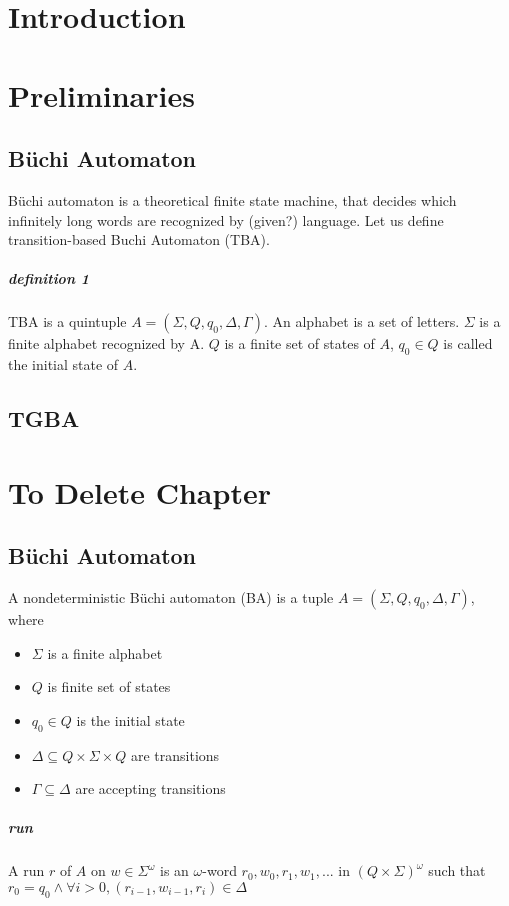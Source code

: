 \documentclass{fithesis3}
\begin{document}
	\chapter{Introduction}
	\chapter{Preliminaries}
		\section{Büchi Automaton}
			Büchi automaton is a theoretical finite state machine, that decides which infinitely long words are recognized by (given?) language. Let us define transition-based Buchi Automaton (TBA).
			\paragraph{definition 1}
			TBA is a quintuple $A=(\Sigma, Q, q_0, \Delta, \Gamma)$. An alphabet is a set of letters. $\Sigma$ is a finite alphabet recognized by A. $Q$ is a finite set of states of $A$, $q_0 \in Q$ is called the initial state of $A$.
		\section{TGBA}
	\chapter{To Delete Chapter}
		\section{Büchi Automaton}
		A nondeterministic Büchi automaton (BA) is a tuple 
		$A=(\Sigma, Q, q_0, \Delta, \Gamma)$,
		where
		\begin{itemize}
			\item $\Sigma$ is a finite alphabet
			\item $Q$ is finite set of states
			\item $q_0 \in Q$ is the initial state
			\item $\Delta \subseteq Q \times \Sigma \times Q$
			are transitions
			\item $\Gamma \subseteq \Delta$
			are accepting transitions
		\end{itemize} 
		\paragraph{run}
		A run $r$ of $A$ on $w \in \Sigma^\omega$
		is an $\omega$-word $r_0, w_0, r_1, w_1,...$ in $(Q\times\Sigma)^\omega$
		such that $r_0 = q_0 \land\forall i>0, (r_{i-1}, w_{i-1}, r_i) \in \Delta$ 
\end{document}
